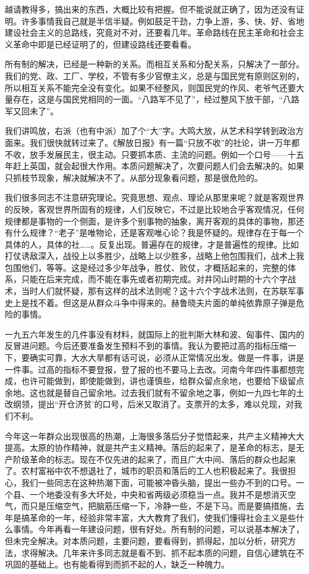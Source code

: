 越请教得多，搞出来的东西，大概比较有把握。但不能说就正确了，因为还没有证明。许多事情我自己就是半信半疑。例如鼓足干劲，力争上游，多、快、好、省地建设社会主义的总路线，究竟对不对，还要看几年。革命路线在民主革命和社会主义革命中即是已经证明了的，但建设路线还要看看。

所有制的解决，已经是一种新的关系。而相互关系和分配关系，只解决了一部分。我们的党、政、工厂、学校，不管有多少官僚主义，总是与国民党有原则区别的，所以相互关系不能完全没有变化。如果不经整风，则国民党的作风、老爷气还要大量存在，这是与国民党相同的一面。“八路军不见了”，经过整风下放干部，“八路军又回未了”。

我们讲鸣放，右派（也有中派）加了个“大”字。大鸣大放，从艺术科学转到政治方面来。我们很快就转过来了。《解放日报》有一篇“只放不收”的社论，讲一万年都不收，放手发展民主，很主动。只要抓本质、主流的问题。例如一个口号——十五年赶上英国，就会起很大作用。本质问题解决了，次要问题人们会去解决的。如果只抓枝节现象，解决就解决不了。从部分现象看问题，那是很危险的。

我们很多同志不注意研究理论。究竟思想、观点、理论从那里来呢？就是客观世界的反映，客观世界所固有的规律，人们反映它，不过是比较地合乎客观情况，任何规律都是事物的一个侧面，是许多个别事物的抽象，离开客观的具体的事物，那还有什么规律？“老子”是唯物论，还是客观唯心论？我是怀疑的。规律存在于每一个具体的人，具体的社……。反复出现。普遍存在的规律，才是普遍性的规律。比如打仗诱敌深入，战役上以多胜少，战略上以少胜多，战略上他包围我们，战术上我包围他们，等等。这是经过多少年战争，胜仗、败仗，才概括起来的，完整的体系，只能在后来完成，而不能在事先或者初期完成。对井冈山时期的十六个字战术，当时人们就怀疑，那有这样的战术法则呢？这十六个字战术法则，在苏联军事史上是找不着。但这是从群众斗争中得来的。赫鲁晓夫片面的单纯依靠原子弹是危险的事情。

一九五六年发生的几件事没有材料，就国际上的批判斯大林和波、匈事件、国内的反冒进问题。今后还要准备发生预料不到的事情。我认为要把过高的指标压缩一下，要确实可靠，大水大旱都有话可说，必须从正常情况出发。做是一件事，讲是一件事。过高的指标不要登报，登了报的也不要马上去改。河南今年四件事都想完成，也许可能做到，即使能做到，讲也谨慎些，给群众留点余地，也要给下级留点余地。这也就是替自己留余地。过去我们就有不留余地之事，例如一九四七年的土改纲领，提出“开仓济贫’的口号，后米又取消了。支票开的太多，难以兑现，对我们不利。

今年这一年群众出现很高的热潮，上海很多落后分子觉悟起来，共产主义精神大大提高。太原的协作精神，就是共产主义精神。落后的起来了，是革命的标志，是无产阶级革命的标志。现在不仅先进的起来了，而且广大中间、落后的群众也起来了。农村富裕中农不想退社了，城市的职员和落后的工人也积极起来了。我很担心，我们一些同志在这种热潮下面，可能被冲昏头脑，提出一些办不到的口号。一个县、一个地委没有多大坏处，中央和省两级必须稳当一点。我并不是想消灭空气，而只是压缩空气，把脑筋压缩一下，冷静一些，不是下马。而是要搞措施，去年是搞革命的一年，经验非常丰富，大大教育了我们，使我们懂得社会主义是些什么事情。今年再看一年建设问题，很有好处。所有制的问题，可以说基本解决了，但未完全解决。对本质问题，主要问题，要看得到，抓得起，加以分析，研究方法，求得解决。几年来许多同志就是看不到、抓不起本质的问题，自信心建筑在不巩固的基础上。也有能看得到而抓不起的人，缺乏一种魄力。

